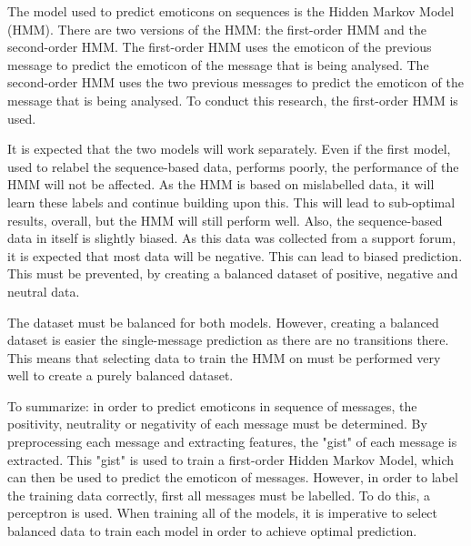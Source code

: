 The model used to predict emoticons on sequences is the Hidden Markov Model (HMM). There are two versions of the HMM: the first-order HMM and the second-order HMM. The first-order HMM uses the emoticon of the previous message to predict the emoticon of the message that is being analysed. The second-order HMM uses the two previous messages to predict the emoticon of the message that is being analysed. To conduct this research, the first-order HMM is used.

It is expected that the two models will work separately. Even if the first model, used to relabel the sequence-based data, performs poorly, the performance of the HMM will not be affected. As the HMM is based on mislabelled data, it will learn these labels and continue building upon this. This will lead to sub-optimal results, overall, but the HMM will still perform well. Also, the sequence-based data in itself is slightly biased. As this data was collected from a support forum, it is expected that most data will be negative. This can lead to biased prediction. This must be prevented, by creating a balanced dataset of positive, negative and neutral data. 

The dataset must be balanced for both models. However, creating a balanced dataset is easier the single-message prediction as there are no transitions there. This means that selecting data to train the HMM on must be performed very well to create a purely balanced dataset.

To summarize: in order to predict emoticons in sequence of messages, the positivity, neutrality or negativity of each message must be determined. By preprocessing each message and extracting features, the "gist" of each message is extracted. This "gist" is used to train a first-order Hidden Markov Model, which can then be used to predict the emoticon of messages. However, in order to label the training data correctly, first all messages must be labelled. To do this, a perceptron is used. When training all of the models, it is imperative to select balanced data to train each model in order to achieve optimal prediction.
